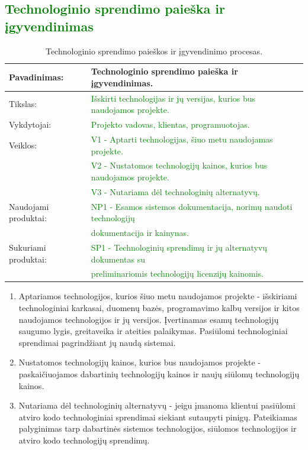 \documentclass{VUMIFPSkursinis}
\begin{document}
	\subsection{\textcolor{green}{Technologinio sprendimo paieška ir įgyvendinimas}}
	\begin{center}
		\begin{table}[ht]
			\caption{Technologinio sprendimo paieškos ir įgyvendinimo procesas.}
			\begin{tabular}{ | l | l | }
				\hline
				Pavadinimas:          & Technologinio sprendimo paieška ir įgyvendinimas.									\\ \hline
				Tikslas:              & \textcolor{green}{Išskirti technologijas ir jų versijas, kurios bus naudojamos projekte. 	}					\\ \hline
				Vykdytojai:           & \textcolor{green}{Projekto vadovas, klientas, programuotojas.}										\\ \hline
				Veiklos:              & \textcolor{green}{V1 - Aptarti technologijas, šiuo metu naudojamas projekte.} 								\\
				                      & \textcolor{green}{V2 - Nustatomos technologijų kainos, kurios bus naudojamos projekte.}							\\
				                      & \textcolor{green}{V3 - Nutariama dėl technologinių alternatyvų.	}									\\ \hline
				Naudojami produktai:	& \textcolor{green}{NP1 - Esamos sistemos dokumentacija, norimų naudoti technologijų} \\& \textcolor{green}{dokumentacija ir kainynas. 	}		\\ \hline
				Sukuriami produktai:	& \textcolor{green}{SP1 - Technologinių sprendimų ir jų alternatyvų dokumentas su} \\& \textcolor{green}{preliminariomis technologijų licenzijų kainomis.}	\\ \hline
			\end{tabular}
		\end{table}
	\end{center}
	\newpage
	\begin{enumerate}
		\item{
			Aptariamos technologijos, kurios šiuo metu naudojamos projekte - išskiriami technologiniai karkasai, duomenų bazės, programavimo kalbų versijos ir kitos naudojamos technologijos ir jų versijos.
			Įvertinamas esamų technologijų saugumo lygis, greitaveika ir ateities palaikymas.
			Pasiūlomi technologiniai sprendimai pagrindžiant jų naudą sistemai.
		}
		\item{Nustatomos technologijų kainos, kurios bus naudojamos projekte - paskaičiuojamos dabartinių technologijų kainos ir naujų siūlomų technologijų kainos.}
		\item{
			Nutariama dėl technologinių alternatyvų - jeigu įmanoma klientui pasiūlomi atviro kodo technologiniai sprendimai siekiant sutaupyti pinigų.
			Pateikiamas palyginimas tarp dabartinės sistemos technologijos, siūlomos technologijos ir atviro kodo technologijų sprendimų.
		}
	\end{enumerate}
\end{document}
